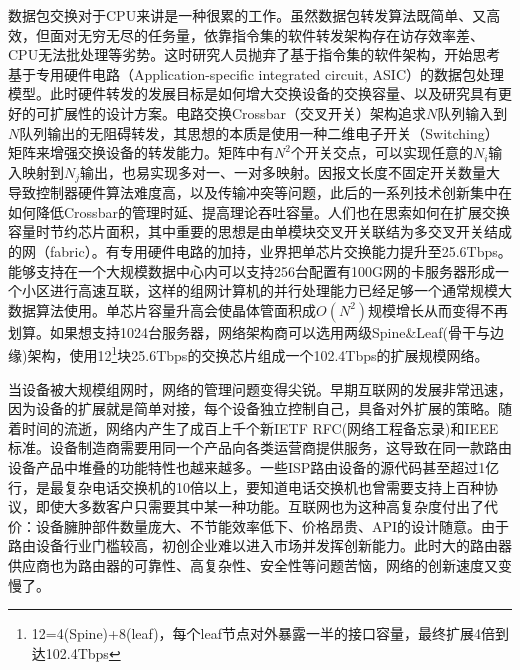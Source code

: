 
数据包交换对于CPU来讲是一种很累的工作。虽然数据包转发算法既简单、又高效，但面对无穷无尽的任务量，依靠指令集的软件转发架构存在访存效率差、CPU无法批处理等劣势。这时研究人员抛弃了基于指令集的软件架构，开始思考基于专用硬件电路（Application-specific integrated circuit, ASIC）的数据包处理模型。此时硬件转发的发展目标是如何增大交换设备的交换容量、以及研究具有更好的可扩展性的设计方案。电路交换Crossbar（交叉开关）架构追求$N$队列输入到$N$队列输出的无阻碍转发，其思想的本质是使用一种二维电子开关（Switching）矩阵来增强交换设备的转发能力。矩阵中有$N^2$个开关交点，可以实现任意的$N_i$输入映射到$N_j$输出，也易实现多对一、一对多映射。因报文长度不固定开关数量大导致控制器硬件算法难度高，以及传输冲突等问题，此后的一系列技术创新集中在如何降低Crossbar的管理时延、提高理论吞吐容量。人们也在思索如何在扩展交换容量时节约芯片面积，其中重要的思想是由单模块交叉开关联结为多交叉开关结成的网（fabric）。有专用硬件电路的加持，业界把单芯片交换能力提升至25.6Tbps。能够支持在一个大规模数据中心内可以支持256台配置有100G网的卡服务器形成一个小区进行高速互联，这样的组网计算机的并行处理能力已经足够一个通常规模大数据算法使用。单芯片容量升高会使晶体管面积成$O(N^2)$规模增长从而变得不再划算。如果想支持1024台服务器，网络架构商可以选用两级Spine\&Leaf(骨干与边缘)架构，使用12\footnote{12=4(Spine)+8(leaf)，每个leaf节点对外暴露一半的接口容量，最终扩展4倍到达102.4Tbps}块25.6Tbps的交换芯片组成一个102.4Tbps的扩展规模网络。

当设备被大规模组网时，网络的管理问题变得尖锐。早期互联网的发展非常迅速，因为设备的扩展就是简单对接，每个设备独立控制自己，具备对外扩展的策略。随着时间的流逝，网络内产生了成百上千个新IETF RFC(网络工程备忘录)和IEEE标准。设备制造商需要用同一个产品向各类运营商提供服务，这导致在同一款路由设备产品中堆叠的功能特性也越来越多。一些ISP路由设备的源代码甚至超过1亿行，是最复杂电话交换机的10倍以上，要知道电话交换机也曾需要支持上百种协议，即使大多数客户只需要其中某一种功能。互联网也为这种高复杂度付出了代价：设备臃肿部件数量庞大、不节能效率低下、价格昂贵、API的设计随意。由于路由设备行业门槛较高，初创企业难以进入市场并发挥创新能力。此时大的路由器供应商也为路由器的可靠性、高复杂性、安全性等问题苦恼，网络的创新速度又变慢了。




